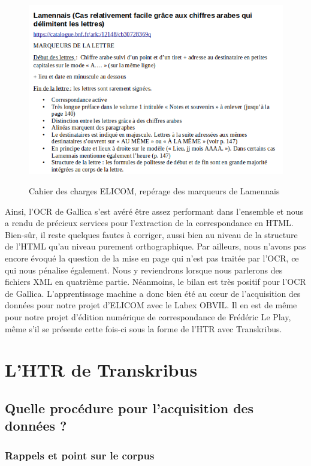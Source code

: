 \begin{figure}[ht]
    \centering
    \caption{Cahier des charges ELICOM, repérage des marqueurs de Lamennais}
    \includegraphics[width=16cm]{images/cdc_lamennais.png}
    \label{cdc_lamennais}
\end{figure}

Ainsi, l'OCR de Gallica s'est avéré être assez performant dans l'ensemble et nous a rendu de précieux services pour l'extraction de la correspondance en HTML. Bien-sûr, il reste quelques fautes à corriger, aussi bien au niveau de la structure de l'HTML qu'au niveau purement orthographique. Par ailleurs, nous n'avons pas encore évoqué la question de la mise en page qui n'est pas traitée par l'OCR, ce qui nous pénalise également. Nous y reviendrons lorsque nous parlerons des fichiers XML en quatrième partie. Néanmoins, le bilan est très positif pour l'OCR de Gallica. L'apprentissage machine a donc bien été au c\oe ur de l'acquisition des données pour notre projet d'ELICOM avec le Labex OBVIL. Il en est de même pour notre projet d'édition numérique de correspondance de Frédéric Le Play, même s'il se présente cette fois-ci sous la forme de l'HTR avec Transkribus.

\chapter{L'HTR de Transkribus}


\section{Quelle procédure pour l'acquisition des données ?}

\subsection{Rappels et point sur le corpus}

